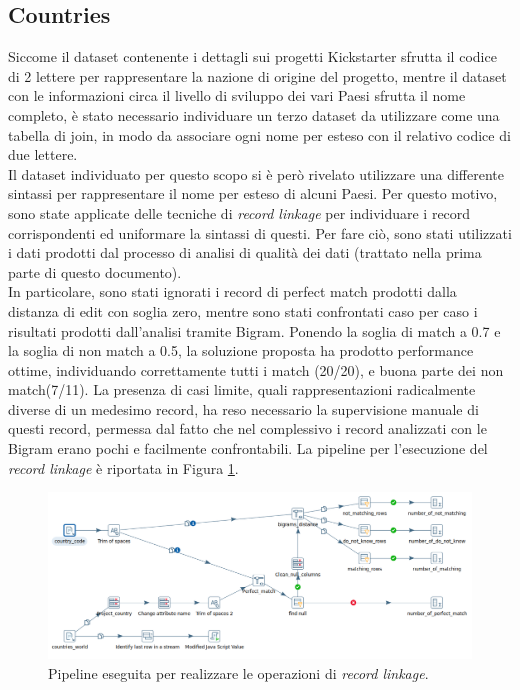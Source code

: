 \subsection{Countries}
Siccome il dataset contenente i dettagli sui progetti Kickstarter sfrutta il codice di 2 lettere per rappresentare la nazione di origine del progetto, mentre il dataset con le informazioni circa il livello di sviluppo dei vari Paesi sfrutta il nome completo, è stato necessario individuare un terzo dataset da utilizzare come una tabella di join, in modo da associare ogni nome per esteso con il relativo codice di due lettere.\\
Il dataset individuato per questo scopo si è però rivelato utilizzare una differente sintassi per rappresentare il nome per esteso di alcuni Paesi. Per questo motivo, sono state applicate delle tecniche di \textit{record linkage} per individuare i record corrispondenti ed uniformare la sintassi di questi. Per fare ciò, sono stati utilizzati i dati prodotti dal processo di analisi di qualità dei dati (trattato nella prima parte di questo documento).\\
In particolare, sono stati ignorati i record di perfect match prodotti dalla distanza di edit con soglia zero, mentre sono stati confrontati caso per caso i risultati prodotti dall'analisi tramite Bigram. Ponendo la soglia di match a 0.7 e la soglia di non match a 0.5, la soluzione proposta ha prodotto performance ottime, individuando correttamente tutti i match (20/20), e buona parte dei non match(7/11). La presenza di casi limite, quali rappresentazioni radicalmente diverse di un medesimo record, ha reso necessario la supervisione manuale di questi record, permessa dal fatto che nel complessivo i record analizzati con le Bigram erano pochi e facilmente confrontabili. La pipeline per l'esecuzione del \textit{record linkage} è riportata in Figura \ref{fig:recordlinkage}.\\

\begin{figure}
	\centering
	\includegraphics[width=0.7\linewidth]{images/RecordLinkage}
	\caption{Pipeline eseguita per realizzare le operazioni di \textit{record linkage}.}
	\label{fig:recordlinkage}
\end{figure}

